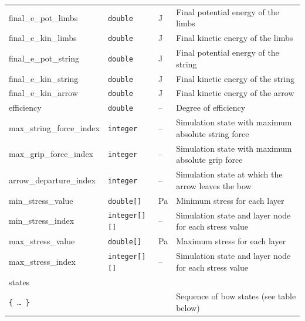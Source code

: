 \documentclass[12pt]{article}
\begin{document}
\begin{table}[H]
{\begin{tabular}{ l | l | l | l }
\quad final\_e\_pot\_limbs & \texttt{double} & \unit[]{J} & Final potential energy of the limbs \\
\quad final\_e\_kin\_limbs & \texttt{double} & \unit[]{J} & Final kinetic energy of the limbs \\
\quad final\_e\_pot\_string & \texttt{double} & \unit[]{J} & Final potential energy of the string \\
\quad final\_e\_kin\_string & \texttt{double} & \unit[]{J} & Final kinetic energy of the string \\
\quad final\_e\_kin\_arrow & \texttt{double} & \unit[]{J} & Final kinetic energy of the arrow \\
\quad efficiency & \texttt{double} & -- & Degree of efficiency \\
\quad max\_string\_force\_index & \texttt{integer} & -- & Simulation state with maximum absolute string force \\
\quad max\_grip\_force\_index & \texttt{integer} & -- & Simulation state with maximum absolute grip force \\
\quad arrow\_departure\_index & \texttt{integer} & -- & Simulation state at which the arrow leaves the bow \\
\quad min\_stress\_value & \texttt{double[]} & \unit[]{Pa} & Minimum stress for each layer \\
\quad min\_stress\_index & \texttt{integer[][]} & -- & Simulation state and layer node for each stress value \\
\quad max\_stress\_value & \texttt{double[]} & \unit[]{Pa} & Maximum stress for each layer \\
\quad max\_stress\_index & \texttt{integer[][]} & -- & Simulation state and layer node for each stress value \\
\quad states & & & \\
\quad\quad \texttt{\{\ \ldots\ \}} & & & Sequence of bow states (see table below) \\
\end{tabular}}
\end{table}
\end{document}
